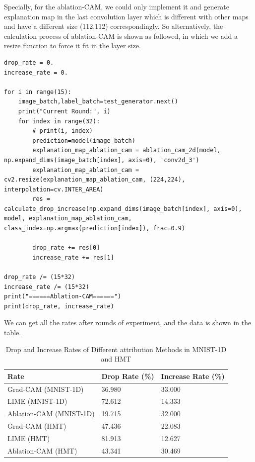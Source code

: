 \documentclass[conference]{IEEEtran}
\begin{document}
Specially, for the ablation-CAM, we could only implement it and generate explanation map in the last convolution layer which is different with other maps and have a different size (112,112) correspondingly. So alternatively, the calculation process of ablation-CAM is shown as followed, in which we add a resize function to force it fit in the layer size.

\begin{lstlisting}
drop_rate = 0.
increase_rate = 0.

for i in range(15):
    image_batch,label_batch=test_generator.next()
    print("Current Round:", i)
    for index in range(32):
        # print(i, index)
        prediction=model(image_batch)
        explanation_map_ablation_cam = ablation_cam_2d(model, np.expand_dims(image_batch[index], axis=0), 'conv2d_3')
        explanation_map_ablation_cam = cv2.resize(explanation_map_ablation_cam, (224,224), interpolation=cv.INTER_AREA)
        res = calculate_drop_increase(np.expand_dims(image_batch[index], axis=0), model, explanation_map_ablation_cam, class_index=np.argmax(prediction[index]), frac=0.9)

        drop_rate += res[0]
        increase_rate += res[1]

drop_rate /= (15*32)
increase_rate /= (15*32)
print("======Ablation-CAM======")
print(drop_rate, increase_rate)
\end{lstlisting}

We can get all the rates after rounds of experiment, and the data is shown in the table.

\begin{table}[h]
\caption{Drop and Increase Rates of Different attribution Methods in MNIST-1D and HMT}
\begin{tabular}{|l|l|l|}
\hline
Rate                    & Drop Rate (\%) & Increase Rate (\%) \\ \hline
Grad-CAM (MNIST-1D)     & 36.980         & 33.000             \\ \hline
LIME (MNIST-1D)   & 72.612         & 14.333             \\ \hline
Ablation-CAM (MNIST-1D) & 19.715         & 32.000             \\ \hline
Grad-CAM (HMT)          & 47.436         & 22.083             \\ \hline
LIME (HMT)        & 81.913         & 12.627             \\ \hline
Ablation-CAM (HMT)      & 43.341         & 30.469             \\ \hline
\end{tabular}
\end{table}
\end{document}
